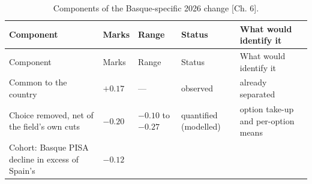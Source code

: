 \documentclass[
  10.5pt,
  a4paper,
  DIV=11,
  numbers=noendperiod]{scrartcl}
\begin{document}
\begin{longtable}[]{@{}
  >{\raggedright\arraybackslash}p{}
  >{\raggedleft\arraybackslash}p{}
  >{\raggedright\arraybackslash}p{}
  >{\raggedright\arraybackslash}p{}
  >{\raggedright\arraybackslash}p{}@{}}
\caption{Components of the Basque-specific 2026 change {[}Ch.
6{]}.}\label{tbl-b-components}\tabularnewline
\toprule\noalign{}
\begin{minipage}[b]{\linewidth}\raggedright
Component
\end{minipage} & \begin{minipage}[b]{\linewidth}\raggedleft
Marks
\end{minipage} & \begin{minipage}[b]{\linewidth}\raggedright
Range
\end{minipage} & \begin{minipage}[b]{\linewidth}\raggedright
Status
\end{minipage} & \begin{minipage}[b]{\linewidth}\raggedright
What would identify it
\end{minipage} \\
\midrule\noalign{}
\endfirsthead
\toprule\noalign{}
\begin{minipage}[b]{\linewidth}\raggedright
Component
\end{minipage} & \begin{minipage}[b]{\linewidth}\raggedleft
Marks
\end{minipage} & \begin{minipage}[b]{\linewidth}\raggedright
Range
\end{minipage} & \begin{minipage}[b]{\linewidth}\raggedright
Status
\end{minipage} & \begin{minipage}[b]{\linewidth}\raggedright
What would identify it
\end{minipage} \\
\midrule\noalign{}
\endhead
\bottomrule\noalign{}
\endlastfoot
Common to the country & \(+0.17\) & --- & observed & already
separated \\
Choice removed, net of the field's own cuts & \(-0.20\) & \(-0.10\) to
\(-0.27\) & quantified (modelled) & option take-up and per-option
means \\
Cohort: Basque PISA decline in excess of Spain's & \(-0.12\) &

\end{longtable}
\end{document}
